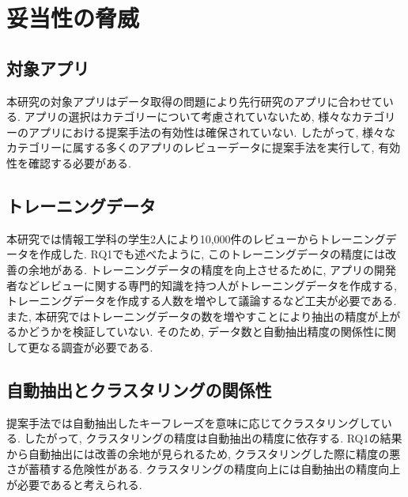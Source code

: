 \section{妥当性の脅威}
\subsection{対象アプリ}
本研究の対象アプリはデータ取得の問題により先行研究のアプリに合わせている. アプリの選択はカテゴリーについて考慮されていないため, 様々なカテゴリーのアプリにおける提案手法の有効性は確保されていない. 
したがって, 様々なカテゴリーに属する多くのアプリのレビューデータに提案手法を実行して, 有効性を確認する必要がある. 

\subsection{トレーニングデータ}
本研究では情報工学科の学生2人により10,000件のレビューからトレーニングデータを作成した. RQ1でも述べたように, このトレーニングデータの精度には改善の余地がある. 
トレーニングデータの精度を向上させるために, アプリの開発者などレビューに関する専門的知識を持つ人がトレーニングデータを作成する, トレーニングデータを作成する人数を増やして議論するなど工夫が必要である. 
また, 本研究ではトレーニングデータの数を増やすことにより抽出の精度が上がるかどうかを検証していない. そのため, データ数と自動抽出精度の関係性に関して更なる調査が必要である. 

\subsection{自動抽出とクラスタリングの関係性}
提案手法では自動抽出したキーフレーズを意味に応じてクラスタリングしている. したがって, クラスタリングの精度は自動抽出の精度に依存する. 
RQ1の結果から自動抽出には改善の余地が見られるため, クラスタリングした際に精度の悪さが蓄積する危険性がある. クラスタリングの精度向上には自動抽出の精度向上が必要であると考えられる. 